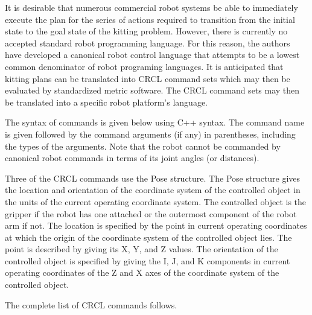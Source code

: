 
It is desirable that numerous commercial robot systems be able to 
immediately execute the plan for the series of actions required to transition from the initial state
to the goal state of the kitting problem. However, there is currently no
accepted standard robot programming language. For this reason, the authors
have developed a canonical robot control language that attempts to be
a lowest common denominator of robot programing languages. It is anticipated
that kitting plans can be translated into  CRCL command sets which may then be
evaluated by standardized metric software. The CRCL command sets may then
be translated into a specific robot platform's language.

The syntax of commands is given below using C++ syntax. The command
name is given followed by the command arguments (if any) in parentheses,
including the types of the arguments.
Note that the robot cannot be commanded by canonical robot commands in
terms of its joint angles (or distances).

Three of the CRCL commands use the Pose structure. The Pose structure gives
the location and orientation of the coordinate system of the controlled
object in the units of the current operating coordinate system. 
The controlled object is the gripper if the robot has one attached
or the outermost component of the robot arm if not.  The location is
specified by the point in current operating coordinates at which the
origin of the coordinate system of the controlled object lies. The point is
described by giving its X, Y, and Z values. The orientation of the
controlled object is specified by giving the I, J, and K components in
current operating coordinates of the Z and X axes of the coordinate
system of the controlled object. 

The complete list of CRCL commands follows.


